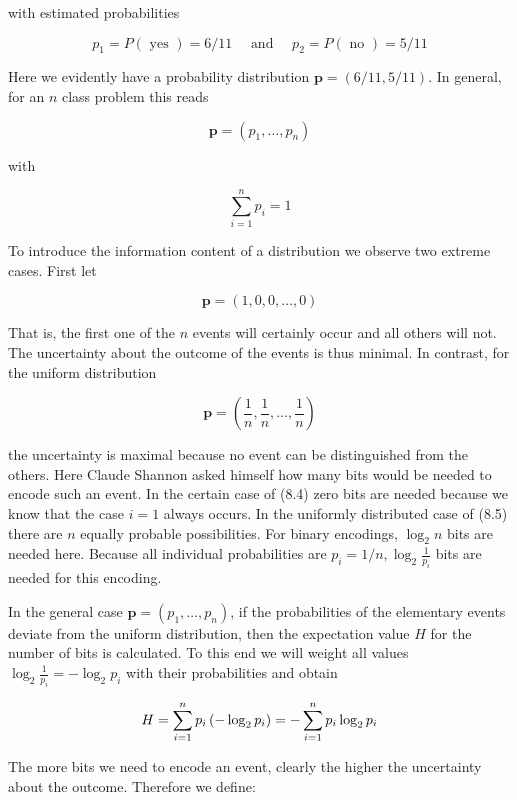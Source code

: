 \documentclass[10pt]{book}
\begin{document}
with estimated probabilities

$$
p_{1}=P(\text { yes })=6 / 11 \quad \text { and } \quad p_{2}=P(\text { no })=5 / 11
$$

Here we evidently have a probability distribution $\boldsymbol{p}=(6 / 11,5 / 11)$. In general, for an $n$ class problem this reads

$$
\boldsymbol{p}=\left(p_{1}, \ldots, p_{n}\right)
$$

with

$$
\sum_{i=1}^{n} p_{i}=1
$$

To introduce the information content of a distribution we observe two extreme cases. First let


\begin{equation*}
\boldsymbol{p}=(1,0,0, \ldots, 0) \tag{8.4}
\end{equation*}


That is, the first one of the $n$ events will certainly occur and all others will not. The uncertainty about the outcome of the events is thus minimal. In contrast, for the uniform distribution


\begin{equation*}
\boldsymbol{p}=\left(\frac{1}{n}, \frac{1}{n}, \ldots, \frac{1}{n}\right) \tag{8.5}
\end{equation*}


the uncertainty is maximal because no event can be distinguished from the others. Here Claude Shannon asked himself how many bits would be needed to encode such an event. In the certain case of (8.4) zero bits are needed because we know that the case $i=1$ always occurs. In the uniformly distributed case of (8.5) there are $n$ equally probable possibilities. For binary encodings, $\log _{2} n$ bits are needed here. Because all individual probabilities are $p_{i}=1 / n, \log _{2} \frac{1}{p_{i}}$ bits are needed for this encoding.

In the general case $\boldsymbol{p}=\left(p_{1}, \ldots, p_{n}\right)$, if the probabilities of the elementary events deviate from the uniform distribution, then the expectation value $H$ for the number of bits is calculated. To this end we will weight all values $\log _{2} \frac{1}{p_{i}}=-\log _{2} p_{i}$ with their probabilities and obtain

$$
H=\sum_{i=1}^{n} p_{i}\left(-\log _{2} p_{i}\right)=-\sum_{i=1}^{n} p_{i} \log _{2} p_{i}\index{Pruning}
$$

The more bits we need to encode an event, clearly the higher the uncertainty about the outcome. Therefore we define:
\end{document}
